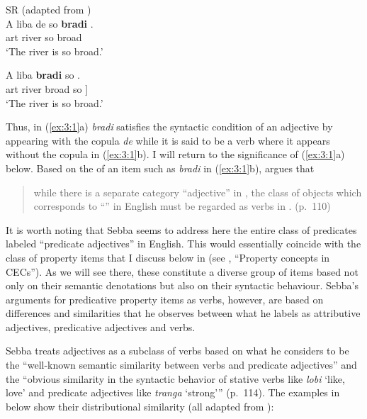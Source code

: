 \ea%
\label{ex:3:1}
SR (adapted from \citealt[112]{Sebba1986})\\
\ea
\gll A liba     de {\ob} so \textbf{bradi} {\cb}.\\
    art river {\COP} {}  so         broad {}\\
\glt `The river is so broad.'

\ex
\gll A liba {\ob} \textbf{bradi} so {\cb}.\\
	art river        {\ob} broad so ]\\
\glt `The river is so broad.' \z \z

Thus, in (\ref{ex:3:1}a) \textit{bradi} satisfies the syntactic
condition of an adjective by appearing with the copula \textit{de}
while it is said to be a  verb where it appears without the
copula in (\ref{ex:3:1}b).  I will return to the significance of
(\ref{ex:3:1}a) below.  Based on the  of an item such
as \textit{bradi} in (\ref{ex:3:1}b), \citet{Sebba1986} argues that

\begin{quote}
while there is a separate category ``adjective” in  , the class
of objects which corresponds to ``” in English must
be regarded as verbs in . (p.~110)
\end{quote}

It is worth noting that Sebba seems to address here the entire class
of predicates labeled ``predicate adjectives'' in English.  This would
essentially coincide with the class of property items that I discuss
below in  (see , ``Property concepts
in CECs'').  As we will see there, these constitute a diverse group of
items based not only on their semantic denotations but also on their
syntactic behaviour.  Sebba’s arguments for predicative property items
as  verbs, however, are based on differences and similarities
that he observes between what he labels as attributive adjectives,
predicative adjectives and  verbs.

Sebba treats adjectives as a subclass of  verbs based on what
he considers to be the ``well-known semantic similarity between verbs
and predicate adjectives” and the ``obvious similarity in the syntactic
behavior of  stative verbs like \textit{lobi} `like, love' and
predicate adjectives like \textit{tranga} `strong'” (p.~114).  The
examples in  below show their distributional similarity (all
adapted from \citealt[114]{Sebba1986}):

